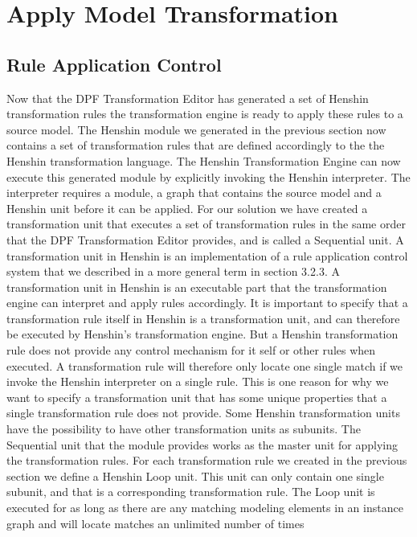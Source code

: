 \section{Apply Model Transformation}

\subsection{Rule Application Control}

Now that the DPF Transformation Editor has generated a set of Henshin
transformation rules the transformation engine is ready to apply these rules to
a source model. The Henshin module we generated in the previous section now contains a set of
transformation rules that are defined accordingly to the the Henshin
transformation language. The Henshin Transformation Engine can now execute this
generated module by explicitly invoking the Henshin interpreter. The
interpreter requires a module, a graph that contains the source model and a
Henshin unit before it can be applied. For our solution we have created a
transformation unit that executes a set of transformation rules in the same
order that the DPF Transformation Editor provides, and is called a Sequential
unit. A transformation unit in Henshin is an implementation of a rule
application control system that we described in a more general term in section
3.2.3. A transformation unit in Henshin is an executable part that the
transformation engine can interpret and apply rules accordingly. It is
important to specify that a transformation rule itself in Henshin is a
transformation unit, and can therefore be executed by Henshin's transformation
engine. But a Henshin transformation rule does not provide any control
mechanism for it self or other rules when executed.
A transformation rule will therefore only locate one single match if we
invoke the Henshin interpreter on a single rule. This is one reason for why we want to
specify a transformation unit that has some unique properties that a single
transformation rule does not provide. Some Henshin transformation units have the
possibility to have other transformation units as subunits.
The Sequential unit that the module provides works as the master unit for
applying the transformation rules. For each transformation rule we created in
the previous section we define a Henshin Loop unit. This unit can only contain
one single subunit, and that is a corresponding transformation rule. The
Loop unit is executed for as long as there are any matching modeling elements
in an instance graph and will locate matches an unlimited number of times
